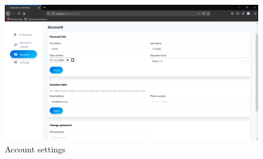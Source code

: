 \begin{figure}[H]
    \centering
    \includegraphics[width=\textwidth]{Include/Resources/Frontend/Account.png}
    \caption{Account settings} 
    \label{fig:Account}
\end{figure}


